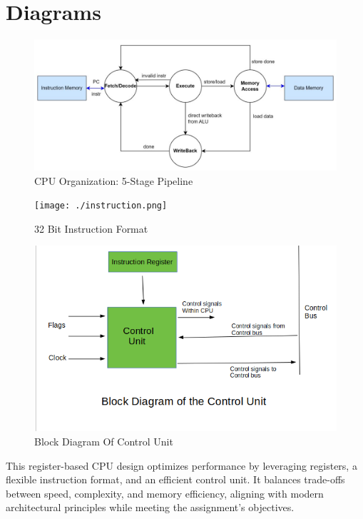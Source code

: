 \documentclass[a4paper,12pt]{article}
\begin{document}
\section{Diagrams}
    \begin{figure}[H] %
        \centering
        \includegraphics[width=1.0\textwidth]{./cpu1.jpg}
        \caption{CPU Organization: 5-Stage Pipeline}
    \end{figure}
    \begin{figure}[H] %
        \centering
        \texttt{[image: ./instruction.png]}
        \caption{32 Bit Instruction Format}
    \end{figure}
    \begin{figure}[H] %
        \centering
        \includegraphics[width=1.0\textwidth]{./control_unit.png}
        \caption{Block Diagram Of Control Unit}
    \end{figure}

This register-based CPU design optimizes performance by leveraging registers, a flexible instruction format, and an efficient control unit. It balances trade-offs between speed, complexity, and memory efficiency, aligning with modern architectural principles while meeting the assignment’s objectives.
\newpage
\end{document}
